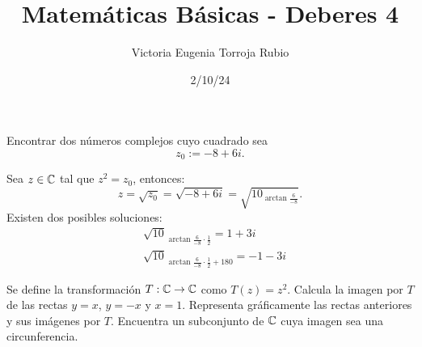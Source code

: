 \documentclass{article}
\begin{document}
\title{Matemáticas Básicas - Deberes 4}
\author{Victoria Eugenia Torroja Rubio}
\date{2/10/24}

\maketitle

\begin{ej}
Encontrar dos números complejos cuyo cuadrado sea
\[z_{0} := -8+6i .\]
\end{ej}

\begin{sol}
Sea $\displaystyle z\in\mathbb{C} $ tal que $\displaystyle z^{2}=z_{0} $, entonces:
\[z = \sqrt{z_{0}} = \sqrt{-8+6i} = \sqrt{10_{\arctan\frac{6}{-8}}}
.\]
Existen dos posibles soluciones:
\[
\begin{split}
& \sqrt{10}_{\arctan\frac{6}{-8}\cdot\frac{1}{2}}=1+3i\\
& \sqrt{10}_{\arctan\frac{6}{-8}\cdot\frac{1}{2}+180}=-1-3i
\end{split}
\]
\end{sol}

\begin{ej}
Se define la transformación $\displaystyle T:\mathbb{C} \to \mathbb{C} $ como $\displaystyle T\left(z\right)=z^{2} $. Calcula la imagen por $\displaystyle T $ de las rectas $\displaystyle y = x $, $\displaystyle y = -x $ y $\displaystyle x = 1 $. Representa gráficamente las rectas anteriores y sus imágenes por $\displaystyle T $. Encuentra un subconjunto de $\displaystyle \mathbb{C} $ cuya imagen sea una circunferencia.
\end{ej}
\end{document}
